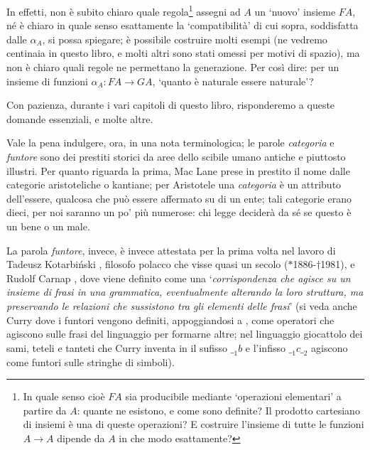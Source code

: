 In effetti, non è subito chiaro quale regola\footnote{In quale senso cioè \(FA\) sia producibile mediante `operazioni elementari' a partire da \(A\): quante ne esistono, e come sono definite? Il prodotto cartesiano di insiemi è una di queste operazioni? E costruire l'insieme di tutte le funzioni \(A\to A\) dipende da \(A\) in che modo esattamente?} assegni ad \(A\) un `nuovo' insieme \(FA\), né è chiaro in quale senso esattamente la `compatibilità' di cui sopra, soddisfatta dalle \(\alpha_A\), si possa spiegare; è possibile costruire molti esempi (ne vedremo centinaia in questo libro, e molti altri sono stati omessi per motivi di spazio), ma non è chiaro quali regole ne permettano la generazione. Per così dire: per un insieme di funzioni \(\alpha_A : FA \to GA\), `quanto è naturale essere naturale'?

\medskip
Con pazienza, durante i vari capitoli di questo libro, risponderemo a queste domande essenziali, e molte altre.

\medskip
Vale la pena indulgere, ora, in una nota terminologica; le parole \emph{categoria} e \emph{funtore} sono dei prestiti storici da aree dello scibile umano antiche e piuttosto illustri. Per quanto riguarda la prima, Mac Lane prese in prestito il nome dalle categorie aristoteliche o kantiane; per Aristotele \cite{Barnes2014-wz} una \emph{categoria} è un attributo dell'essere, qualcosa che può essere affermato su di un ente; tali categorie erano dieci, per noi saranno un po' più numerose: chi legge deciderà da sé se questo è un bene o un male.

La parola \emph{funtore}, invece, è invece attestata per la prima volta nel lavoro di Tadeusz Kotarbi\'nski \cite{kotarbione}, filosofo polacco che visse quasi un secolo (\(*\)1886-\(\dag\)1981), e Rudolf Carnap \cite{carnappio}, dove viene definito come una `\emph{corrispondenza che agisce su un insieme di frasi in una grammatica, eventualmente alterando la loro struttura, ma preservando le relazioni che sussistono tra gli elementi delle frasi}' (si veda anche Curry \cite{Curry1961SomeLA} dove i funtori vengono definiti, appoggiandosi a \cite{kotarbione}, come operatori che agiscono sulle frasi del linguaggio per formarne altre; nel linguaggio giocattolo dei sami, teteli e tanteti che Curry inventa in \cite{Curry1961SomeLA} il sufisso \({\_}_1b\) e l'infisso \({\_}_1 c {\_}_2\) agiscono come funtori sulle stringhe di simboli).


